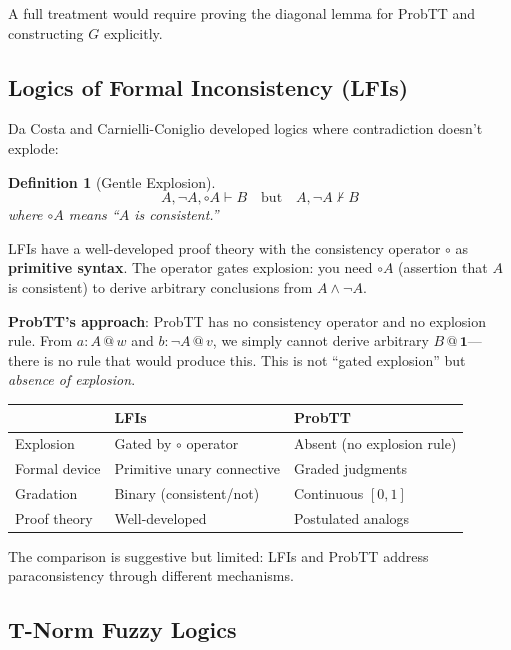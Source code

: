 \documentclass[11pt,a4paper]{article}
\makeatletter
\newtheorem{definition}{Definition}[section]
\newcommand{\at}[1]{\,@\,#1}
\newcommand{\one}{\mathbf{1}}
\makeatother
\begin{document}
A full treatment would require proving the diagonal lemma for ProbTT and constructing $G$ explicitly.

\subsection{Logics of Formal Inconsistency (LFIs)}

Da Costa \citep{dacosta1974paraconsistent} and Carnielli-Coniglio \citep{carnielli2016paraconsistent} developed logics where contradiction doesn't explode:

\begin{definition}[Gentle Explosion]
\[
A, \neg A, \circ A \vdash B \quad \text{but} \quad A, \neg A \not\vdash B
\]
where $\circ A$ means ``$A$ is consistent.''
\end{definition}

LFIs have a well-developed proof theory with the consistency operator $\circ$ as \textbf{primitive syntax}. The operator gates explosion: you need $\circ A$ (assertion that $A$ is consistent) to derive arbitrary conclusions from $A \land \neg A$.

\textbf{ProbTT's approach}: ProbTT has no consistency operator and no explosion rule. From $a : A \at{w}$ and $b : \neg A \at{v}$, we simply cannot derive arbitrary $B \at{\one}$---there is no rule that would produce this. This is not ``gated explosion'' but \emph{absence of explosion}.

\begin{center}
\begin{tabular}{l|l|l}
& \textbf{LFIs} & \textbf{ProbTT} \\
\hline
Explosion & Gated by $\circ$ operator & Absent (no explosion rule) \\
Formal device & Primitive unary connective & Graded judgments \\
Gradation & Binary (consistent/not) & Continuous $[0,1]$ \\
Proof theory & Well-developed & Postulated analogs \\
\end{tabular}
\end{center}

The comparison is suggestive but limited: LFIs and ProbTT address paraconsistency through different mechanisms.

\subsection{T-Norm Fuzzy Logics}
\end{document}
